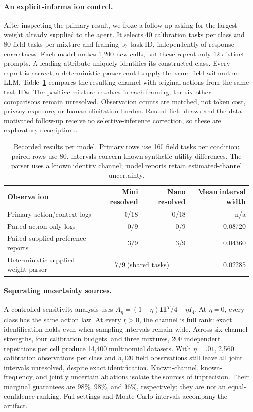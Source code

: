 \documentclass[manuscript,review,anonymous]{acmart}
\begin{document}
\paragraph{An explicit-information control.}
After inspecting the primary result, we froze a follow-up asking for the largest weight already supplied to the agent. It selects 40 calibration tasks per class and 80 field tasks per mixture and framing by task ID, independently of response correctness. Each model makes 1,200 new calls, but these repeat only 12 distinct prompts. A leading attribute uniquely identifies its constructed class. Every report is correct; a deterministic parser could supply the same field without an LLM. Table~\ref{tab:result} compares the resulting channel with original actions from the same task IDs. The positive mixture resolves in each framing; the six other comparisons remain unresolved. Observation counts are matched, not token cost, privacy exposure, or human elicitation burden. Reused field draws and the data-motivated follow-up receive no selective-inference correction, so these are exploratory descriptions.

\begin{table}[t]
\centering
\caption{Recorded results per model. Primary rows use 160 field tasks per condition; paired rows use 80. Intervals concern known synthetic utility differences. The parser uses a known identity channel; model reports retain estimated-channel uncertainty.}
\label{tab:result}
\begin{tabular}{lrrr}
\toprule Observation & Mini resolved & Nano resolved & Mean interval width \\\midrule
Primary action/context logs & 0/18 & 0/18 & n/a \\
Paired action-only logs & 0/9 & 0/9 & 0.08720 \\
Paired supplied-preference reports & 3/9 & 3/9 & 0.04360 \\
Deterministic supplied-weight parser & \multicolumn{2}{c}{7/9 (shared tasks)} & 0.02285 \\\bottomrule
\end{tabular}
\end{table}

\paragraph{Separating uncertainty sources.}
A controlled sensitivity analysis uses $A_\eta=(1-\eta)\mathbf1\mathbf1^T/4+\eta I_4$. At $\eta=0$, every class has the same action law. At every $\eta>0$, the channel is full rank: exact identification holds even when sampling intervals remain wide. Across six channel strengths, four calibration budgets, and three mixtures, 200 independent repetitions per cell produce 14,400 multinomial datasets. With $\eta=.01$, 2,560 calibration observations per class and 5,120 field observations still leave all joint intervals unresolved, despite exact identification. Known-channel, known-frequency, and jointly uncertain ablations isolate the sources of imprecision. Their marginal guarantees are 98\%, 98\%, and 96\%, respectively; they are not an equal-confidence ranking. Full settings and Monte Carlo intervals accompany the artifact. 
\end{document}
